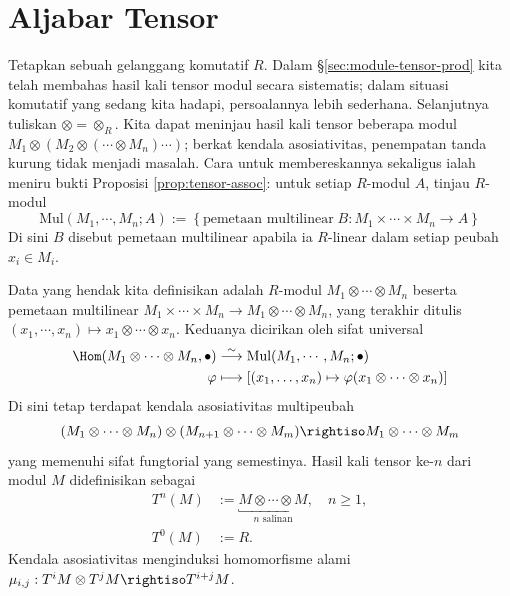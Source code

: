 \section{Aljabar Tensor}
Tetapkan sebuah gelanggang komutatif $R$. Dalam \S\ref{sec:module-tensor-prod} kita telah membahas hasil kali tensor modul secara sistematis; dalam situasi komutatif yang sedang kita hadapi, persoalannya lebih sederhana. Selanjutnya tuliskan $\otimes = \otimes_R$. Kita dapat meninjau hasil kali tensor beberapa modul $M_1 \otimes (M_2 \otimes (\cdots \otimes M_n )\cdots)$; berkat kendala asosiativitas, penempatan tanda kurung tidak menjadi masalah. Cara untuk membereskannya sekaligus ialah meniru bukti Proposisi \ref{prop:tensor-assoc}: untuk setiap $R$-modul $A$, tinjau $R$-modul
\[ \text{Mul}(M_1, \cdots, M_n; A) := \left\{ \text{pemetaan multilinear}\; B: M_1 \times \cdots \times M_n \to A \right\} \]
Di sini $B$ disebut pemetaan multilinear apabila ia $R$-linear dalam setiap peubah $x_i \in M_i$.

Data yang hendak kita definisikan adalah $R$-modul $M_1 \otimes \cdots \otimes M_n$ beserta pemetaan multilinear $M_1 \times \cdots \times M_n \to M_1 \otimes \cdots \otimes M_n$, yang terakhir ditulis $(x_1, \cdots, x_n) \mapsto x_1 \otimes \cdots \otimes x_n$. Keduanya dicirikan oleh sifat universal
\begin{equation}\label{eqn:Mul-tensor}\begin{aligned}
	\Hom(M_1 \otimes \cdots \otimes M_n, \bullet) & \stackrel{\sim}{\longrightarrow} \text{Mul}(M_1, \cdots, M_n; \bullet) \\
	\varphi & \longmapsto [ (x_1, \ldots, x_n) \mapsto \varphi(x_1 \otimes \cdots \otimes x_n) ]
\end{aligned}\end{equation}
Di sini tetap terdapat kendala asosiativitas multipeubah
\[ (M_1 \otimes \cdots \otimes M_n) \otimes (M_{n+1} \otimes \cdots \otimes M_m) \rightiso M_1 \otimes \cdots \otimes M_m \]
yang memenuhi sifat fungtorial yang semestinya. Hasil kali tensor ke-$n$ dari modul $M$ didefinisikan sebagai
\begin{align*}
	T^n(M) & := \underbracket{M \otimes \cdots \otimes M}_{n \text{ salinan}}, \quad n \geq 1, \\
	T^0(M) & := R.
\end{align*}
Kendala asosiativitas menginduksi homomorfisme alami $\mu_{i,j}: T^i M \otimes T^j M \rightiso T^{i+j} M$.

